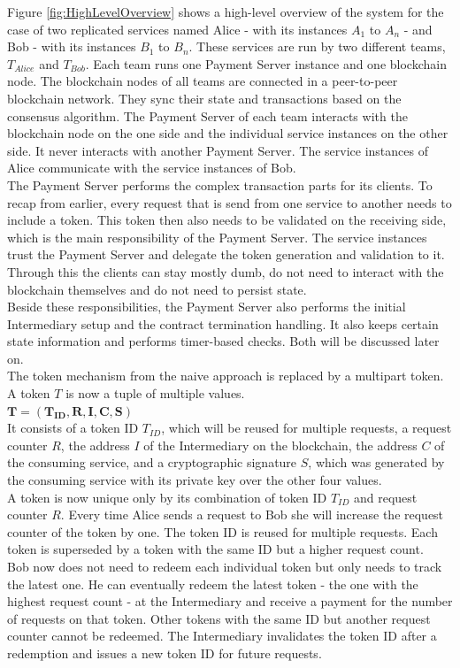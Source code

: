 \documentclass[a4paper,12pt]{scrartcl}
\begin{document}
Figure \ref{fig:HighLevelOverview} shows a high-level overview of the system for the case of two replicated services named Alice - with its instances $A_1$ to $A_n$ - and Bob - with its instances $B_1$ to $B_n$. These services are run by two different teams, $T_{Alice}$ and $T_{Bob}$. Each team runs one Payment Server instance and one blockchain node. The blockchain nodes of all teams are connected in a peer-to-peer blockchain network. They sync their state and transactions based on the consensus algorithm. The Payment Server of each team interacts with the blockchain node on the one side and the individual service instances on the other side. It never interacts with another Payment Server. The service instances of Alice communicate with the service instances of Bob.\\

The Payment Server performs the complex transaction parts for its clients. To recap from earlier, every request that is send from one service to another needs to include a token. This token then also needs to be validated on the receiving side, which is the main responsibility of the Payment Server. The service instances trust the Payment Server and delegate the token generation and validation to it. Through this the clients can stay mostly dumb, do not need to interact with the blockchain themselves and do not need to persist state.\\
Beside these responsibilities, the Payment Server also performs the initial Intermediary setup and the contract termination handling. It also keeps certain state information and performs timer-based checks. Both will be discussed later on.\\

The token mechanism from the naive approach is replaced by a multipart token. A token $T$ is now a tuple of multiple values.\\

$\mathbf{T = (T_{ID}, R, I, C, S)}$\\

It consists of a token ID $T_{ID}$, which will be reused for multiple requests, a request counter $R$, the address $I$ of the Intermediary on the blockchain, the address $C$ of the consuming service, and a cryptographic signature $S$, which was generated by the consuming service with its private key over the other four values.\\

A token is now unique only by its combination of token ID $T_{ID}$ and request counter $R$. Every time Alice sends a request to Bob she will increase the request counter of the token by one. The token ID is reused for multiple requests. Each token is superseded by a token with the same ID but a higher request count.\\
Bob now does not need to redeem each individual token but only needs to track the latest one. He can eventually redeem the latest token - the one with the highest request count - at the Intermediary and receive a payment for the number of requests on that token. Other tokens with the same ID but another request counter cannot be redeemed. The Intermediary invalidates the token ID after a redemption and issues a new token ID for future requests.\\
\end{document}
